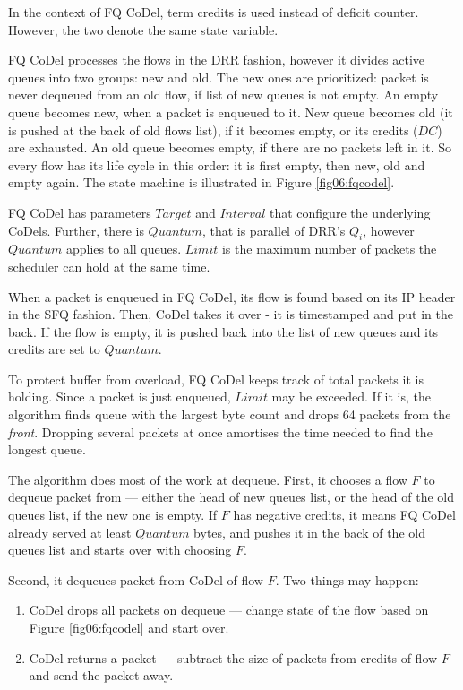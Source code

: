In the context of FQ CoDel, term credits is used instead of deficit counter. However, the two denote the same state variable.

FQ CoDel processes the flows in the DRR fashion, however it divides active queues into two groups: new and old. The new ones are prioritized: packet is never dequeued from an old flow, if list of new queues is not empty. An empty queue becomes new, when a packet is enqueued to it. New queue becomes old (it is pushed at the back of old flows list), if it becomes empty, or its credits ($DC$) are exhausted. An old queue becomes empty, if there are no packets left in it. So every flow has its life cycle in this order: it is first empty, then new, old and empty again. The state machine is illustrated in Figure \ref{fig06:fqcodel}.

FQ CoDel has parameters $Target$ and $Interval$ that configure the underlying CoDels. Further, there is $Quantum$, that is parallel of DRR's $Q_i$, however $Quantum$ applies to all queues. $Limit$ is the maximum number of packets the scheduler can hold at the same time.

When a packet is enqueued in FQ CoDel, its flow is found based on its IP header in the SFQ fashion. Then, CoDel takes it over - it is timestamped and put in the back. If the flow is empty, it is pushed back into the list of new queues and its credits are set to $Quantum$.

To protect buffer from overload, FQ CoDel keeps track of total packets it is holding. Since a packet is just enqueued, $Limit$ may be exceeded. If it is, the algorithm finds queue with the largest byte count and drops 64 packets from the \textit{front}. Dropping several packets at once amortises the time needed to find the longest queue.

The algorithm does most of the work at dequeue. First, it chooses a flow $F$ to dequeue packet from --- either the head of new queues list, or the head of the old queues list, if the new one is empty. If $F$ has negative credits, it means FQ CoDel already served at least $Quantum$ bytes, and pushes it in the back of the old queues list and starts over with choosing $F$.

Second, it dequeues packet from CoDel of flow $F$. Two things may happen:
\begin{enumerate}
	\item CoDel drops all packets on dequeue --- change state of the flow based on Figure \ref{fig06:fqcodel} and start over.
	\item CoDel returns a packet --- subtract the size of packets from credits of flow $F$ and send the packet away.
\end{enumerate}

